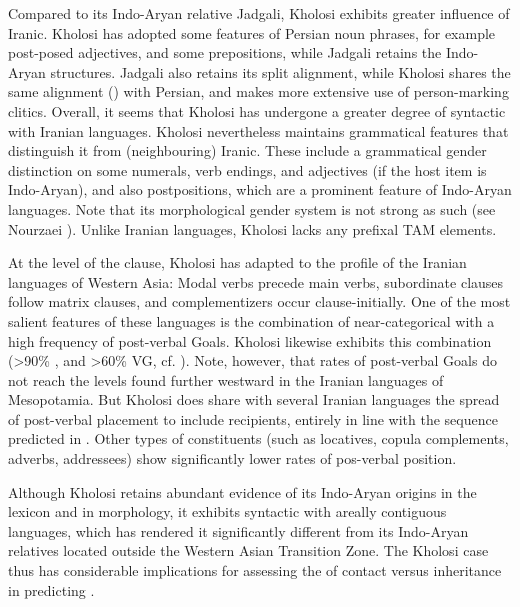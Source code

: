 \documentclass[output=paper,colorlinks,citecolor=brown]{langscibook}
\begin{document}
Compared to its Indo-Aryan relative Jadgali, Kholosi exhibits greater influence of Iranic. Kholosi has adopted some features of Persian noun phrases, for example post-posed adjectives, and some prepositions, while Jadgali retains the Indo-Aryan structures. Jadgali also retains its split  alignment, while Kholosi shares the same alignment () with Persian, and makes more extensive use of person-marking clitics. Overall, it seems that Kholosi has undergone a greater degree of syntactic  with Iranian languages. Kholosi nevertheless maintains grammatical features that distinguish it from (neighbouring) Iranic. These include a grammatical gender distinction on some numerals, verb endings, and adjectives (if the host item is Indo-Aryan), and also postpositions, which are a prominent feature of Indo-Aryan languages. Note that its morphological gender system is not strong as such (see Nourzaei \citealt{nourzaei_forthcoming_morphosyntax}). Unlike Iranian languages, Kholosi lacks any prefixal TAM elements. 

At the level of the clause, Kholosi has adapted to the profile of the Iranian languages of Western Asia: Modal verbs precede main verbs, subordinate clauses follow matrix clauses, and complementizers occur clause-initially. One of the most salient features of these languages is the combination of near-categorical  with a high frequency of post-verbal Goals. Kholosi likewise exhibits this combination (>90\% , and >60\% VG, cf. ). Note, however, that rates of post-verbal Goals do not reach the levels found further westward in the Iranian languages of Mesopotamia. But Kholosi does share with several Iranian languages the spread of post-verbal placement to include recipients, entirely in line with the sequence predicted in . Other types of constituents (such as locatives, copula complements, adverbs, addressees) show significantly lower rates of pos-verbal position.

Although Kholosi retains abundant evidence of its Indo-Aryan origins in the lexicon and in morphology, it exhibits syntactic  with areally contiguous languages, which has rendered it significantly different from its Indo-Aryan relatives located outside the Western Asian Transition Zone. The Kholosi case thus has considerable implications for assessing the  of contact versus inheritance in predicting . 
\end{document}
